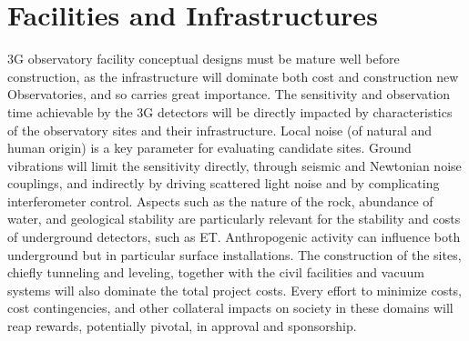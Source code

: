 \chapter{Facilities and Infrastructures}
\label{sec:Fac_Inf}
3G observatory facility conceptual designs must be mature well before construction, as the infrastructure will dominate both cost and construction  new Observatories, and so carries great importance. The sensitivity and observation time achievable by the 3G detectors will be directly impacted by characteristics of the observatory sites and their infrastructure. Local noise (of natural and human origin) is a key parameter for evaluating candidate sites. Ground vibrations will limit the sensitivity directly, through seismic and Newtonian noise couplings, and indirectly by driving scattered light noise and by complicating interferometer control. Aspects such as the nature of the rock, abundance of water, and geological stability are particularly relevant for the stability and costs of underground detectors, such as ET. Anthropogenic activity can influence both underground but in particular surface installations. The construction of the sites, chiefly tunneling and leveling, together with the civil facilities and vacuum systems will also dominate the total project costs. Every effort to minimize costs, cost contingencies, and other collateral impacts on society in these domains will reap rewards, potentially pivotal, in approval and sponsorship.

% 

